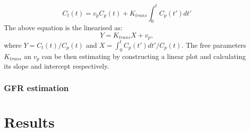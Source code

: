 \begin{equation}
	\label{eq:patlak}
	C_{t}(t) =v_pC_p(t) + K_{trans}\int_{0}^{t}C_p(t')dt'  
\end{equation}
The above equation is the linearised as:
\begin{equation}
	\label{eq:patlak_lin}
	Y = K_{trans}X +v_p,  
\end{equation}
where $Y=C_t(t)/C_p(t)$ and $X=\int_{0}^{t}C_p(t')dt'/C_p(t)$. The free parameters $K_{trans}$ an $v_p$ can be then estimating by constructing a linear plot and calculating its slope and intercept respectively.


\subsubsection{GFR estimation}

\section{Results}



